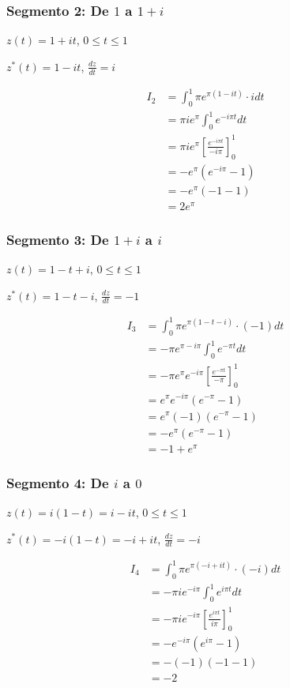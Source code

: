 \documentclass{article}
\begin{document}
\subsubsection*{Segmento 2: De $1$ a $1 + i$}

$z(t) = 1 + it$, $0 \leq t \leq 1$

$z^*(t) = 1 - it$, $\frac{dz}{dt} = i$

\begin{align*}
I_2 &= \int_0^1 \pi e^{\pi(1 - it)} \cdot i dt \\
    &= \pi i e^{\pi} \int_0^1 e^{-i\pi t} dt \\
    &= \pi i e^{\pi} \left[\frac{e^{-i\pi t}}{-i\pi}\right]_0^1 \\
    &= -e^{\pi} (e^{-i\pi} - 1) \\
    &= -e^{\pi} (-1 - 1) \\
    &= 2e^{\pi}
\end{align*}

\subsubsection*{Segmento 3: De $1 + i$ a $i$}

$z(t) = 1 - t + i$, $0 \leq t \leq 1$

$z^*(t) = 1 - t - i$, $\frac{dz}{dt} = -1$

\begin{align*}
I_3 &= \int_0^1 \pi e^{\pi(1 - t - i)} \cdot (-1) dt \\
    &= -\pi e^{\pi - i\pi} \int_0^1 e^{-\pi t} dt \\
    &= -\pi e^{\pi} e^{-i\pi} \left[\frac{e^{-\pi t}}{-\pi}\right]_0^1 \\
    &= e^{\pi} e^{-i\pi} (e^{-\pi} - 1) \\
    &= e^{\pi} (-1) (e^{-\pi} - 1) \\
    &= -e^{\pi} (e^{-\pi} - 1) \\
    &= -1 + e^{\pi}
\end{align*}

\subsubsection*{Segmento 4: De $i$ a $0$}

$z(t) = i(1 - t) = i - it$, $0 \leq t \leq 1$

$z^*(t) = -i(1 - t) = -i + it$, $\frac{dz}{dt} = -i$

\begin{align*}
I_4 &= \int_0^1 \pi e^{\pi(-i + it)} \cdot (-i) dt \\
    &= -\pi i e^{-i\pi} \int_0^1 e^{i\pi t} dt \\
    &= -\pi i e^{-i\pi} \left[\frac{e^{i\pi t}}{i\pi}\right]_0^1 \\
    &= -e^{-i\pi} (e^{i\pi} - 1) \\
    &= -(-1) (-1 - 1) \\
    &= -2
\end{align*}
\end{document}
